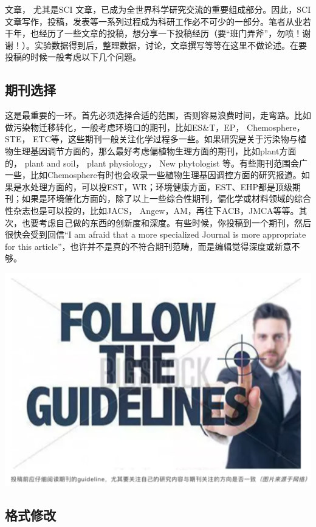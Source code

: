 \documentclass[]{book}
\begin{document}
文章， 尤其是SCI
文章，已成为全世界科学研究交流的重要组成部分。因此，SCI文章写作，投稿，发表等一系列过程成为科研工作必不可少的一部分。笔者从业若干年，也经历了一些文章的投稿，想分享一下投稿经历（要``班门弄斧''，勿喷！谢谢！）。实验数据得到后，整理数据，讨论，文章撰写等等在这里不做论述。在要投稿的时候一般考虑以下几个问题。

\subsection{期刊选择}

这是最重要的一环。首先必须选择合适的范围，否则容易浪费时间，走弯路。比如做污染物迁移转化，一般考虑环境口的期刊，比如ES\&T，EP，
Chemosphere， STE，
ETC等，这些期刊一般关注化学过程多一些。如果研究是关于污染物与植物生理基因调节方面的，那么最好考虑偏植物生理方面的期刊，比如plant方面的，
plant and soil， plant physiology， New phytologist
等。有些期刊范围会广一些，比如Chemosphere有时也会收录一些植物生理基因调控方面的研究报道。如果是水处理方面的，可以投EST，WR；环境健康方面，EST、EHP都是顶级期刊；如果是环境催化方面的，除了以上一些综合性期刊，偏化学或材料领域的综合性杂志也是可以投的，比如JACS，
Angew，AM，再往下ACB，JMCA等等。其次，也要考虑自己做的东西的创新度和深度。有些时候，你投稿到一个期刊，然后很快会受到回信``I
am afraid that a more specialized Journal is more appropriate for this
article''，也许并不是真的不符合期刊范畴，而是编辑觉得深度或新意不够。

\includegraphics[width=6.67in]{images/tougao2}

\subsection{格式修改}
\end{document}
